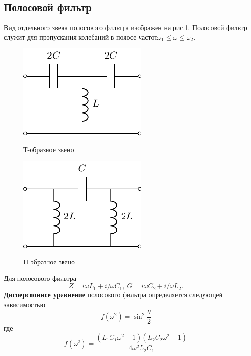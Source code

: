 \subsection{Полосовой фильтр}
Вид отдельного звена полосового фильтра изображен на рис.\ref{fig:7.1}. Полосовой фильтр служит для пропускания колебаний в полосе частот$\omega_1\leq\omega\leq\omega_2$.
\begin{figure}[h!]
	\begin{minipage}{0.49\linewidth}
		\centering
		\includegraphics[]{chem/FHF/FHFT.pdf}
		\caption*{Т-образное звено}
	\end{minipage}
	\begin{minipage}{0.49\linewidth}
		\centering
		\includegraphics[]{chem/FHF/FHFP.pdf}
		\caption*{П-образное звено}
	\end{minipage}
	\caption{}
	\label{fig:7.1}
\end{figure}
Для полосового фильтра
\begin{equation}
\label{eq:7.1}
Z=i\omega L_1+i/\omega C_1,\;G=i\omega C_2+i/\omega L_2.
\end{equation}
\textbf{Дисперсионное уравнение} полосового фильтра определяется следующей зависимостью
\begin{equation}
	\label{eq:7.2}
	f(\omega^2)=\sin^2\frac{\theta}{2}
\end{equation}
где
\begin{equation}
	\label{eq:7.3}
	f(\omega^2)=\frac{(L_1C_1\omega^2-1)(L_2C_2\omega^2-1)}{4\omega^2L_2C_1}
\end{equation}

